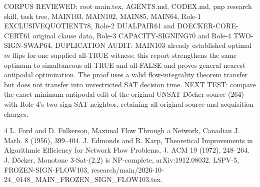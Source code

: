 \documentclass[11pt]{article}
\begin{document}
CORPUS REVIEWED: root main.tex, AGENTS.md, CODEX.md, pnp research skill, task tree, MAIN103, MAIN102, MAIN85, MAIN64, Role-1 EXCLUSIVEQUOTIENT78, Role-2 DUALPAIR61 and DOECKER-CORE-CERT61 original clause data, Role-3 CAPACITY-SIGNING70 and Role-4 TWO-SIGN-SWAP64.
DUPLICATION AUDIT: MAIN103 already established optimal $m$ flips for one supplied all-TRUE witness; this report strengthens the same optimum to simultaneous all-TRUE and all-FALSE and proves general nearest-antipodal optimization. The proof uses a valid flow-integrality theorem transfer but does not transfer into unrestricted SAT decision time.
NEXT TEST: compare the exact minimum antipodal edit of the original UNSAT D\"ocker source (264) with Role-4's two-sign SAT neighbor, retaining all original source and acquisition charges.
\begin{thebibliography}{4}
 L. Ford and D. Fulkerson, Maximal Flow Through a Network, Canadian J. Math. 8 (1956), 399--404.
 J. Edmonds and R. Karp, Theoretical Improvements in Algorithmic Efficiency for Network Flow Problems, J. ACM 19 (1972), 248--264.
 J. D\"ocker, Monotone 3-Sat-(2,2) is NP-complete, arXiv:1912.08032.
 LSPV-5, FROZEN-SIGN-FLOW103, research/main/2026-10-24_0148_MAIN_FROZEN_SIGN_FLOW103.tex.
\end{thebibliography}
\end{document}
